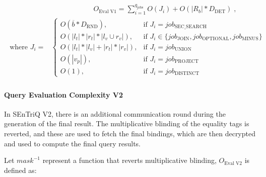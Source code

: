 \begin{align}
    \label{equation:query-evaluation-v1-final}
    \begin{split}
        & \quad \quad \quad \quad \quad \quad O_{\text{Eval V1}} = \sum_{i=1}^{q_{\text{jobs}}} O\left(J_i\right) + O\left( |R_b|*D_{\text{DET}} \right)\;,\\
        \text{where } J_i =&
                    \begin{cases}
                        O\left( \overline{b} * D_{\text{RND}} \right), & \text{if } J_i = job_{\text{SEC\_SEARCH}} \\
                        O\left(|l_t| * |r_t| * |l_v \cup r_v|\right), & \text{if } J_i \in \{job_{\text{JOIN}}, job_{\text{OPTIONAL}}, job_{\text{MINUS}}\} \\
                        O\left(|l_t| * |l_v| + |r_t| * |r_v|\right), & \text{if } J_i = job_{\text{UNION}} \\
                        O\left(|v_p|\right), & \text{if } J_i = job_{\text{PROJECT}} \\
                        O\left(1\right), & \text{if } J_i = job_{\text{DISTINCT}}
                    \end{cases}
    \end{split}
\end{align}

\paragraph{Query Evaluation Complexity V2} In \gls{SEnTriQ} V2, there is an additional communication round during the generation of the final result. The multiplicative blinding of the equality tags is reverted, and these are used to fetch the final bindings, which are then decrypted and used to compute the final query results.

Let $mask^{-1}$ represent a function that reverts multiplicative blinding, $O_{\text{Eval V2}}$ is defined as:

